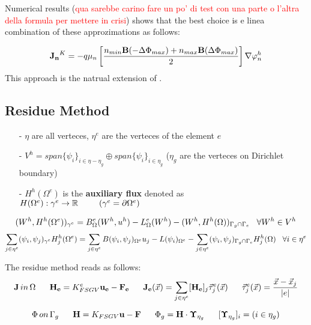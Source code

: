 Numerical results (\textcolor{red}{qua sarebbe carino fare un po' di test con una parte o l'altra della formula per mettere in crisi}) shows that the best choice is e linea combination of these approzimations as follows:

\begin{equation}
\label{eq: first formula for J}
\mathbf{J_n}^K = -  q \mu_n  \left[ \dfrac{ n_{min} \mathbf{B}(-\Delta \Phi_{max})  + n_{max}\mathbf{B}(\Delta \Phi_{max})}{2} \right]\nabla \varphi_n^h
\end{equation}
This approach is the natrual extension of .




\subsection{Residue Method}

\begin{itemize}
\item[-] $\eta$ are all verteces, $\eta^e$ are the verteces of the element $e$
\item[-] $V^h=span\{\psi_i\}_{i\in \eta-\eta_g}\oplus span\{\psi_i\}_{i\in \eta_g}$  ($\eta_g$ are the verteces on Dirichlet boundary)
\item[-] $H^h(\Omega^e)$ is the \textbf{auxiliary flux} denoted as $H(\Omega^e):\gamma^e\rightarrow\mathbb{R} \psp{15}(\gamma^e=\partial \Omega^e)$
\end{itemize}

\begin{equation*}
(W^h,H^h(\Omega^e))_{\gamma^e}=B_\Omega^e(W^h,u^h)-L_\Omega^e(W^h)-(W^h,H^h(\Omega))_{\Gamma_g\cap\Gamma_e} \psp{5} \forall W^h\in V^h
\end{equation*}
\begin{equation*}
\sum_{j\in \eta^e} (\psi_i,\psi_j)_{\gamma^e}H^h_j(\Omega^e)=\sum_{j\in \eta^e}B(\psi_i,\psi_j)_{\Omega^e}u_j-L(\psi_i)_{\Omega^e}-\sum_{j\in \eta^e}(\psi_i,\psi_j)_{\Gamma_g\cap\Gamma_e}H_j^h(\Omega) \psp{5} \forall i \in \eta^e
\end{equation*}

The residue method reads as follows:
$$\vect{J} \, in  \, \Omega \psp{10}
\vect{H_e} = K_{FSGV}^e \vect{u_e} - \vect{F_e} 
\psp{10}
\vect{J_e}(\vec{x}) = \sum_{j\in \eta^e}[\vect{H_e}]_j\vec{\tau}_j^e(\vec{x})
\psp{10}
\vec{\tau}_j^e(\vec{x})=\dfrac{\vec{x}-\vec{x}_j}{|e|}$$

$$\Phi \, on  \, \Gamma_g 
\psp{10}
\vect{H} = K_{FSGV} \vect{u} - \vect{F} 
\psp{10}
\Phi_g = \vect{H} \cdot \vect{\Upsilon}_{\eta_g}
\psp{10}
[\vect{\Upsilon}_{\eta_g}]_i=(i\in \eta_g) $$